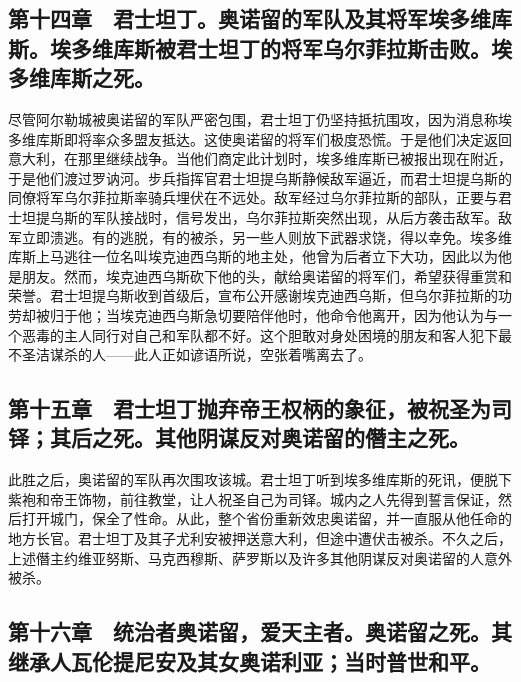 
\subsection{第十四章　君士坦丁。奥诺留的军队及其将军埃多维库斯。埃多维库斯被君士坦丁的将军乌尔菲拉斯击败。埃多维库斯之死。}

尽管阿尔勒城被奥诺留的军队严密包围，君士坦丁仍坚持抵抗围攻，因为消息称埃多维库斯即将率众多盟友抵达。这使奥诺留的将军们极度恐慌。于是他们决定返回意大利，在那里继续战争。当他们商定此计划时，埃多维库斯已被报出现在附近，于是他们渡过罗讷河。步兵指挥官君士坦提乌斯静候敌军逼近，而君士坦提乌斯的同僚将军乌尔菲拉斯率骑兵埋伏在不远处。敌军经过乌尔菲拉斯的部队，正要与君士坦提乌斯的军队接战时，信号发出，乌尔菲拉斯突然出现，从后方袭击敌军。敌军立即溃逃。有的逃脱，有的被杀，另一些人则放下武器求饶，得以幸免。埃多维库斯上马逃往一位名叫埃克迪西乌斯的地主处，他曾为后者立下大功，因此以为他是朋友。然而，埃克迪西乌斯砍下他的头，献给奥诺留的将军们，希望获得重赏和荣誉。君士坦提乌斯收到首级后，宣布公开感谢埃克迪西乌斯，但乌尔菲拉斯的功劳却被归于他；当埃克迪西乌斯急切要陪伴他时，他命令他离开，因为他认为与一个恶毒的主人同行对自己和军队都不好。这个胆敢对身处困境的朋友和客人犯下最不圣洁谋杀的人——此人正如谚语所说，空张着嘴离去了。\par


\subsection{第十五章　君士坦丁抛弃帝王权柄的象征，被祝圣为司铎；其后之死。其他阴谋反对奥诺留的僭主之死。}

此胜之后，奥诺留的军队再次围攻该城。君士坦丁听到埃多维库斯的死讯，便脱下紫袍和帝王饰物，前往教堂，让人祝圣自己为司铎。城内之人先得到誓言保证，然后打开城门，保全了性命。从此，整个省份重新效忠奥诺留，并一直服从他任命的地方长官。君士坦丁及其子尤利安被押送意大利，但途中遭伏击被杀。不久之后，上述僭主约维亚努斯、马克西穆斯、萨罗斯以及许多其他阴谋反对奥诺留的人意外被杀。\par


\subsection{第十六章　统治者奥诺留，爱天主者。奥诺留之死。其继承人瓦伦提尼安及其女奥诺利亚；当时普世和平。}

